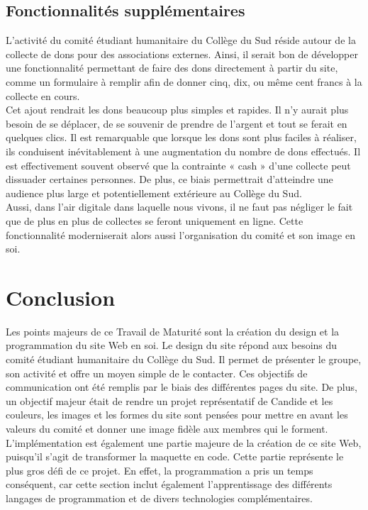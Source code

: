 \documentclass[a4,10pt,french]{sphinxmanual}
\begin{document}
\section{Fonctionnalités supplémentaires}
\label{\detokenize{chapitre-03:fonctionnalites-supplementaires}}
\sphinxAtStartPar
L’activité du comité étudiant humanitaire du Collège du Sud réside autour de la collecte de dons pour des associations externes. Ainsi, il serait bon de développer une fonctionnalité permettant de faire des dons directement à partir du site, comme un formulaire à remplir afin de donner cinq, dix, ou même cent francs à la collecte en cours.\\
Cet ajout rendrait les dons beaucoup plus simples et rapides. Il n’y aurait plus besoin de se déplacer, de se souvenir de prendre de l’argent et tout se ferait en quelques clics. Il est remarquable que lorsque les dons sont plus faciles à réaliser, ils conduisent inévitablement à une augmentation du nombre de dons effectués. Il est effectivement souvent observé que la contrainte « cash » d’une collecte peut dissuader certaines personnes. De plus, ce biais permettrait d’atteindre une audience plus large et potentiellement extérieure au Collège du Sud.\\
Aussi, dans l’air digitale dans laquelle nous vivons, il ne faut pas négliger le fait que de plus en plus de collectes se feront uniquement en ligne. Cette fonctionnalité moderniserait alors aussi l’organisation du comité et son image en soi.


\chapter{Conclusion}
\label{\detokenize{chapitre-04:conclusion}}\label{\detokenize{chapitre-04::doc}}
\sphinxAtStartPar
Les points majeurs de ce Travail de Maturité sont la création du design et la programmation du site Web en soi.
Le design du site répond aux besoins du comité étudiant humanitaire du Collège du Sud. Il permet de présenter le groupe, son activité et offre un moyen simple de le contacter. Ces objectifs de communication ont été remplis par le biais des différentes pages du site. De plus, un objectif majeur était de rendre un projet représentatif de Candide et les couleurs, les images et les formes du site sont pensées pour mettre en avant les valeurs du comité et donner une image fidèle aux membres qui le forment.\\
L’implémentation est également une partie majeure de la création de ce site Web, puisqu’il s’agit de transformer la maquette en code. Cette partie représente le plus gros défi de ce projet. En effet, la programmation a pris un temps conséquent, car cette section inclut également l’apprentissage des différents langages de programmation et de divers technologies complémentaires.
\end{document}
